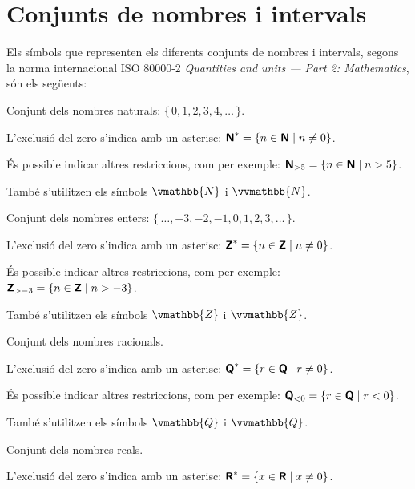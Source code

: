 \section*{Conjunts de nombres i intervals} 

Els símbols que representen els diferents conjunts de nombres i intervals, segons la norma internacional ISO 80000-2 
\textit{Quantities and units --- Part 2: Mathematics}, són els següents:

\begin{list}{}
{\setlength{\labelwidth}{15mm} \setlength{\leftmargin}{20mm}
\setlength{\labelsep}{5mm}}
	 \item[$\mathsfb{N}$] Conjunt dels nombres naturals: $\{\,0,1,2,3,4,\ldots\,\}$. 
	 
	 L'exclusió del zero s'indica amb un asterisc: ${\boldsymbol{\mathsf{N}}}^* = \{ n \in {\ensuremath{\boldsymbol{\mathsf{N}}}} \mid n \ne 0 \}$. 
	 
	 És possible indicar altres restriccions, com per exemple:  ${\boldsymbol{\mathsf{N}}}_{> 5} = \{ n \in {\ensuremath{\boldsymbol{\mathsf{N}}}} \mid n > 5\}$. 
	 
	 També s'utilitzen els símbols $\vmathbb{N}$ i  $\vvmathbb{N}$.
	 
	 \item[$\mathsfb{Z}$] Conjunt dels nombres enters: $\{\,\ldots,-3,-2,-1,0,1,2,3,\ldots\,\}$.  
	 
	 L'exclusió del zero s'indica amb un asterisc: ${\boldsymbol{\mathsf{Z}}}^* = \{ n \in {\ensuremath{\boldsymbol{\mathsf{Z}}}} \mid n \ne 0 \}$. 
	 
	 És possible indicar altres restriccions, com per exemple:  ${\boldsymbol{\mathsf{Z}}}_{> -3} = \{ n \in {\ensuremath{\boldsymbol{\mathsf{Z}}}} \mid n > -3\}$.     
	 
	 També s'utilitzen els símbols $\vmathbb{Z}$ i $\vvmathbb{Z}$.
    
	 \item[$\mathsfb{Q}$] Conjunt dels nombres racionals. 
	 
	 L'exclusió del zero s'indica amb un asterisc: ${\boldsymbol{\mathsf{Q}}}^* = \{ r \in {\ensuremath{\boldsymbol{\mathsf{Q}}}} \mid r \ne 0 \}$. 
	 
	 És possible indicar altres restriccions, com per exemple:  ${\boldsymbol{\mathsf{Q}}}_{< 0} = \{ r \in {\ensuremath{\boldsymbol{\mathsf{Q}}}} \mid r < 0 \}$. 
	 
	 També s'utilitzen els símbols $\vmathbb{Q}$ i $\vvmathbb{Q}$.
	 
	 \item[$\mathsfb{R}$] Conjunt dels nombres reals. 
	 
	 L'exclusió del zero s'indica amb un asterisc: ${\boldsymbol{\mathsf{R}}}^* = \{ x \in {\ensuremath{\boldsymbol{\mathsf{R}}}} \mid x \ne 0 \}$. 
	 

\end{list}
